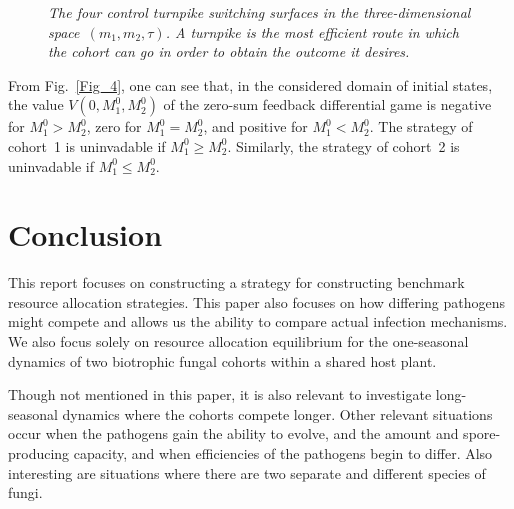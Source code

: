 \documentclass[11pt]{amsart}
\begin{document}
\begin{figure}
\bf \caption{\it The four control turnpike switching surfaces in the three-dimensional
space~$ (m_1, m_2, \tau) $. A turnpike is the most efficient route in which the cohort can go in order to obtain the outcome it desires.}
\label{Fig_7}
\end{figure}

From Fig.~{\rm \ref{Fig_4},} one can see that{\rm ,} in the considered domain
of initial states{\rm ,} the value $ V \left( 0, M_1^0, M_2^0 \right) $ of
the zero-sum feedback differential game is negative for $ M_1^0 > M_2^0 ${\rm ,}
zero for $ M_1^0 = M_2^0 ${\rm ,} and positive for $ M_1^0 < M_2^0 $. The strategy of cohort~{\rm 1} is uninvadable
if $ M_1^0 \geqslant M_2^0 $. Similarly{\rm ,} the strategy of cohort~{\rm 2} is uninvadable if $ M_1^0
\leqslant M_2^0 $. 


\section{Conclusion}
This report focuses on constructing a strategy for constructing benchmark resource allocation strategies. This paper also focuses on how differing pathogens might compete and allows us the ability to compare actual infection mechanisms.
We also focus solely on resource allocation equilibrium for the one-seasonal dynamics of two biotrophic fungal cohorts within a shared host plant. 

Though not mentioned in this paper, it is also relevant to investigate long-seasonal dynamics where the cohorts compete longer. Other relevant situations occur when the pathogens gain the ability to evolve, and the amount and spore-producing capacity, and when efficiencies of the pathogens begin to differ. Also interesting are situations where there are two separate and different species of fungi.
\end{document}

